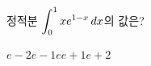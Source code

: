 \hspace*{2mm}\begin{minipage}[t]{\dimexpr\linewidth-2mm\relax}\vspace{0pt}
정적분 $\displaystyle\int_{0}^{1}xe^{1-x}\mkern3mu dx$의 값은?
\begin{choices32}{$e-2$}{$e-1$}{$e$}{$e+1$}{$e+2$}\end{choices32}\end{minipage}
